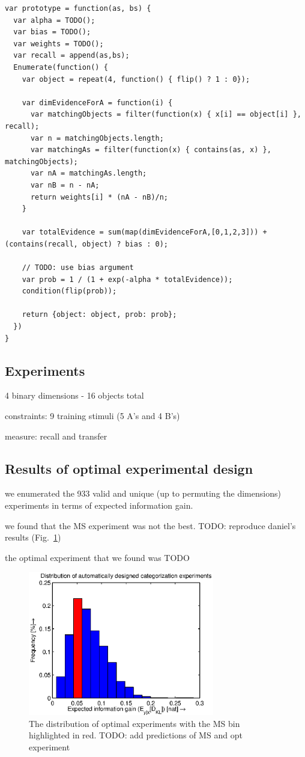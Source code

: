 \documentclass{article}
\newcommand{\cas}[1]{ \textsf{\color{darkgray} \scriptsize #1} }
\begin{document}
\begin{lstlisting}[caption=Prototype model]
var prototype = function(as, bs) {
  var alpha = TODO();
  var bias = TODO();
  var weights = TODO();
  var recall = append(as,bs);
  Enumerate(function() {
    var object = repeat(4, function() { flip() ? 1 : 0});

    var dimEvidenceForA = function(i) {
      var matchingObjects = filter(function(x) { x[i] == object[i] }, recall);
      var n = matchingObjects.length;
      var matchingAs = filter(function(x) { contains(as, x) }, matchingObjects);
      var nA = matchingAs.length;
      var nB = n - nA;
      return weights[i] * (nA - nB)/n;
    }

    var totalEvidence = sum(map(dimEvidenceForA,[0,1,2,3])) + (contains(recall, object) ? bias : 0);

    // TODO: use bias argument
    var prob = 1 / (1 + exp(-alpha * totalEvidence));
    condition(flip(prob));

    return {object: object, prob: prob};
  })
}
\end{lstlisting}

\subsection{Experiments}

\cas{4 binary dimensions - 16 objects total}

\cas{constraints: 9 training stimuli (5 A's and 4 B's)}

\cas{measure: recall and transfer}

\subsection{Results of optimal experimental design}

\cas{we enumerated the 933 valid and unique (up to permuting the dimensions) experiments in terms of expected information gain.}

\cas{we found that the MS experiment was not the best. TODO: reproduce daniel's results (Fig.~\ref{fig:dist})}

\cas{the optimal experiment that we found was TODO}

\begin{figure}[h!]
\centering
\includegraphics[width=3.2in]{img/dist.eps}
\caption{The distribution of optimal experiments with the MS bin highlighted in red. TODO: add predictions of MS and opt experiment}
\label{fig:dist}
\end{figure}
\end{document}
